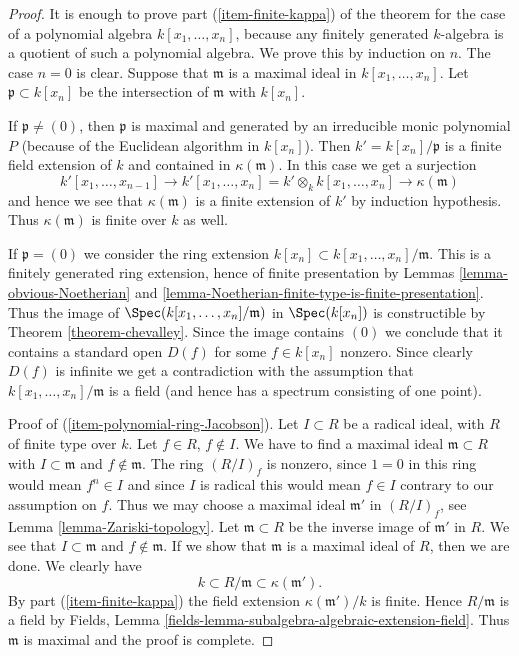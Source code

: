 \begin{proof}
It is enough to prove part (\ref{item-finite-kappa}) of
the theorem for the case of a polynomial
algebra $k[x_1, \ldots, x_n]$, because any finitely generated
$k$-algebra is a quotient of such a polynomial algebra.
We prove this by induction on $n$. The case $n = 0$ is clear.
Suppose that $\mathfrak m$ is a maximal ideal in $k[x_1, \ldots, x_n]$.
Let $\mathfrak p \subset k[x_n]$ be the intersection
of $\mathfrak m$ with $k[x_n]$.

\medskip\noindent
If $\mathfrak p \not = (0)$,
then $\mathfrak p$ is maximal and generated by an irreducible
monic polynomial $P$ (because of the Euclidean algorithm
in $k[x_n]$). Then
$k' = k[x_n]/\mathfrak p$ is a finite field extension of $k$
and contained in $\kappa(\mathfrak m)$. In this case
we get a surjection
$$
k'[x_1, \ldots, x_{n-1}]
\to
k'[x_1, \ldots, x_n] =
k' \otimes_k k[x_1, \ldots, x_n]
\longrightarrow
\kappa(\mathfrak m)
$$
and hence we see that $\kappa(\mathfrak m)$ is a finite
extension  of $k'$ by induction hypothesis. Thus $\kappa(\mathfrak m)$
is finite over $k$ as well.

\medskip\noindent
If $\mathfrak p = (0)$ we consider the ring
extension $k[x_n] \subset k[x_1, \ldots, x_n]/\mathfrak m$.
This is a finitely generated ring extension, hence
of finite presentation by
Lemmas \ref{lemma-obvious-Noetherian} and
\ref{lemma-Noetherian-finite-type-is-finite-presentation}.
Thus the image of $\Spec(k[x_1, \ldots, x_n]/\mathfrak m)$
in $\Spec(k[x_n])$ is constructible by
Theorem \ref{theorem-chevalley}. Since the image
contains $(0)$ we conclude that it contains a standard
open $D(f)$ for some $f\in k[x_n]$ nonzero. Since clearly
$D(f)$ is infinite we get a contradiction with the
assumption that $k[x_1, \ldots, x_n]/\mathfrak m$ is
a field (and hence has a spectrum consisting of one point).

\medskip\noindent
Proof of (\ref{item-polynomial-ring-Jacobson}). Let
$I \subset R$ be a radical ideal, with $R$ of finite type over $k$.
Let $f \in R$, $f \not \in I$. We have to find a maximal ideal
$\mathfrak m \subset R$ with $I \subset \mathfrak m$ and
$f \not \in \mathfrak m$. The ring $(R/I)_f$ is nonzero, since
$1 = 0$ in this ring would mean $f^n \in I$ and since $I$ is
radical this would mean $f \in I$ contrary to our assumption on $f$.
Thus we may choose a maximal ideal $\mathfrak m'$
in $(R/I)_f$, see Lemma \ref{lemma-Zariski-topology}.
Let $\mathfrak m \subset R$
be the inverse image of $\mathfrak m'$ in $R$. We see that
$I \subset \mathfrak m$
and $f \not \in \mathfrak m$. If we show that $\mathfrak m$ is a maximal
ideal of $R$, then we are done. We clearly have
$$
k \subset R/\mathfrak m \subset \kappa(\mathfrak m').
$$
By part (\ref{item-finite-kappa}) the field extension
$\kappa(\mathfrak m')/k$ is finite. Hence
$R/\mathfrak m$ is a field by Fields, Lemma
\ref{fields-lemma-subalgebra-algebraic-extension-field}.
Thus $\mathfrak m$ is maximal and the proof is complete.
\end{proof}
